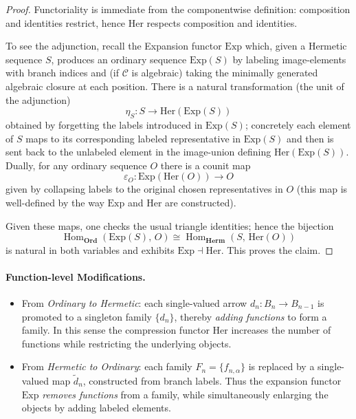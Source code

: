 \documentclass[11pt]{book}
\theoremstyle{definition}
\theoremstyle{plain}
\theoremstyle{remark}
\begin{document}
\begin{proof}[Proof]
Functoriality is immediate from the componentwise definition: composition and identities restrict, hence $\mathrm{Her}$ respects composition and identities.

To see the adjunction, recall the Expansion functor $\mathrm{Exp}$ which, given a Hermetic sequence $S$, produces an ordinary sequence $\mathrm{Exp}(S)$ by labeling image-elements with branch indices and (if $\mathcal{C}$ is algebraic) taking the minimally generated algebraic closure at each position. There is a natural transformation (the unit of the adjunction)
\[
\eta_S: S \longrightarrow \mathrm{Her}(\mathrm{Exp}(S))
\]
obtained by forgetting the labels introduced in $\mathrm{Exp}(S)$; concretely each element of $S$ maps to its corresponding labeled representative in $\mathrm{Exp}(S)$ and then is sent back to the unlabeled element in the image-union defining $\mathrm{Her}(\mathrm{Exp}(S))$. Dually, for any ordinary sequence $O$ there is a counit map
\[
\varepsilon_O: \mathrm{Exp}(\mathrm{Her}(O)) \longrightarrow O
\]
given by collapsing labels to the original chosen representatives in $O$ (this map is well-defined by the way $\mathrm{Exp}$ and $\mathrm{Her}$ are constructed).

Given these maps, one checks the usual triangle identities; hence the bijection
\[
\operatorname{Hom}_{\mathbf{Ord}}(\mathrm{Exp}(S),\,O) \cong \operatorname{Hom}_{\mathbf{Herm}}(S,\,\mathrm{Her}(O))
\]
is natural in both variables and exhibits $\mathrm{Exp}\dashv\mathrm{Her}$. This proves the claim.
\end{proof}

\paragraph{Function-level Modifications.}

\begin{itemize}
    \item From \emph{Ordinary to Hermetic}:
    each single-valued arrow $d_n: B_n \to B_{n-1}$ 
    is promoted to a singleton family $\{d_n\}$, thereby 
    \emph{adding functions} to form a family. 
    In this sense the compression functor $\mathrm{Her}$ 
    increases the number of functions while restricting the underlying objects.

    \item From \emph{Hermetic to Ordinary}:
    each family $F_n=\{f_{n,\alpha}\}$ is replaced by a single-valued map 
    $\tilde d_n$, constructed from branch labels.
    Thus the expansion functor $\mathrm{Exp}$ 
    \emph{removes functions} from a family, 
    while simultaneously enlarging the objects by adding labeled elements.
\end{itemize}
\end{document}

